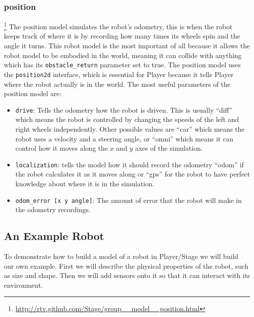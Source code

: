 \documentclass[a4paper]{report}
\newcommand{\plst}{Player/Stage\xspace}
\newcommand{\pl}{Player\xspace}
\begin{document}
\subsubsection{position}\footnote{\url{http://rtv.github.com/Stage/group__model__position.html}}\label{sec:BuildingAWorld:BuildingRobot:RobotSensors:Position}
The position model simulates the robot's odometry, this is when the robot keeps track of where it is by recording how many times its wheels spin and the angle it turns. This robot model is the most important of all because it allows the robot model to be embodied in the world, meaning it can collide with anything which has its \verb|obstacle_return| parameter set to true. The position model uses the \verb|position2d| interface, which is essential for \pl because it tells \pl where the robot actually is in the world.
The most useful parameters of the position model are:
\begin{itemize}
\item \verb|drive|: Tells the odometry how the robot is driven. This is usually ``diff'' which means the robot is controlled by changing the speeds of the left and right wheels independently. Other possible values are ``car'' which means the robot uses a velocity and a steering angle, or ``omni'' which means it can control how it moves along the $x$ and $y$ axes of the simulation.
\item \verb|localization|: tells the model how it should record the odometry ``odom'' if the robot calculates it as it moves along or ``gps'' for the robot to have perfect knowledge about where it is in the simulation. 
\item \verb|odom_error [x y angle]|: The amount of error that the robot will make in the odometry recordings.
\end{itemize}


\subsection{An Example Robot} \label{sec:BuildingAWorld:BuildingRobot:ExampleRobot}

To demonstrate how to build a model of a robot in \plst we will build our own example. First we will describe the physical properties of the robot, such as size and shape. Then we will add sensors onto it so that it can interact with its environment.
\end{document}
